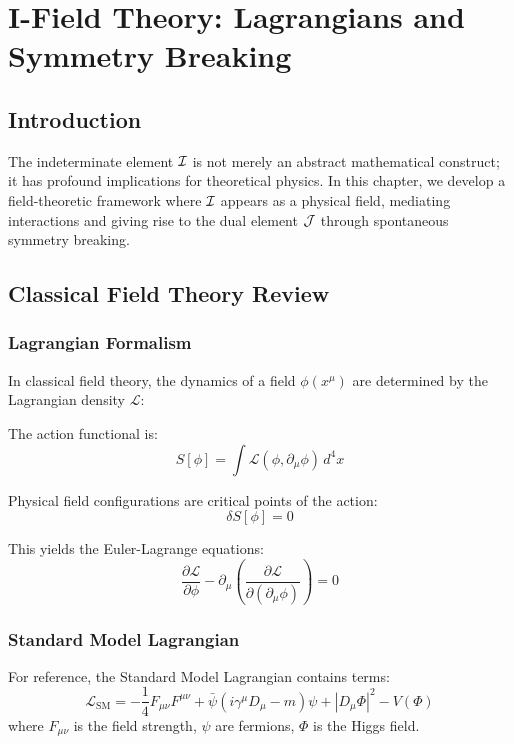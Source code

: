 \chapter{I-Field Theory: Lagrangians and Symmetry Breaking}
\label{ch:field-theory}

\section{Introduction}

The indeterminate element $\mathcal{I}$ is not merely an abstract mathematical construct; it has profound implications for theoretical physics. In this chapter, we develop a field-theoretic framework where $\mathcal{I}$ appears as a physical field, mediating interactions and giving rise to the dual element $\mathcal{J}$ through spontaneous symmetry breaking.

\section{Classical Field Theory Review}

\subsection{Lagrangian Formalism}

In classical field theory, the dynamics of a field $\phi(x^\mu)$ are determined by the Lagrangian density $\mathcal{L}$:

\begin{definition}[Action]
The action functional is:
\[
S[\phi] = \int \mathcal{L}(\phi, \partial_\mu \phi) \, d^4x
\]
\end{definition}

\begin{axiom}
Physical field configurations are critical points of the action:
\[
\delta S[\phi] = 0
\]
\end{axiom}

This yields the Euler-Lagrange equations:
\[
\frac{\partial \mathcal{L}}{\partial \phi} - \partial_\mu \left(\frac{\partial \mathcal{L}}{\partial(\partial_\mu \phi)}\right) = 0
\]

\subsection{Standard Model Lagrangian}

For reference, the Standard Model Lagrangian contains terms:
\[
\mathcal{L}_{\text{SM}} = -\frac{1}{4} F_{\mu\nu} F^{\mu\nu} + \bar{\psi}(i\gamma^\mu D_\mu - m)\psi + |D_\mu \Phi|^2 - V(\Phi)
\]
where $F_{\mu\nu}$ is the field strength, $\psi$ are fermions, $\Phi$ is the Higgs field.

